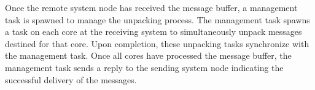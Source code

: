 Once the remote system node has received the message buffer, a
management task is spawned to manage the unpacking process.  The
management task spawns a task on each core at the receiving
system to simultaneously unpack messages destined for that core.
Upon completion, these unpacking tasks synchronize with the management
task.  Once all cores have processed the message buffer, the management
task sends a reply to the sending system node indicating the
successful delivery of the messages.




%
%
%
%
%
% 
% 
% 
